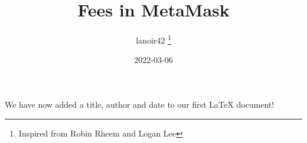 \documentclass[12pt, letterpaper]{article}
\title{Fees in MetaMask}
\author{
    lanoir42
    \thanks{Inspired from Robin Rheem and Logan Lee}
}
\date{2022-03-06}
\begin{document}
    \maketitle

    We have now added a title, author and date to our first \LaTeX{} document!

\end{document}
